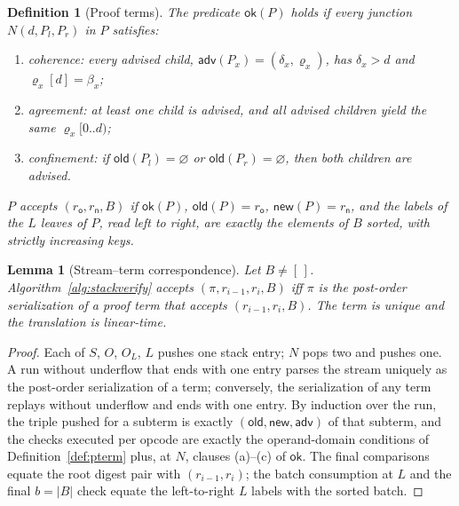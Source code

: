 \documentclass[11pt]{article}
\newtheorem{definition}{Definition}
\newtheorem{lemma}{Lemma}
\begin{document}
\begin{definition}[Proof terms]
The predicate $\mathsf{ok}(P)$ holds if every junction $N(d, P_l, P_r)$ in $P$ satisfies:
\begin{enumerate}[nosep,label=(\alph*)]
  \item \emph{coherence}: every advised child, $\mathsf{adv}(P_x) = (\delta_x, \varrho_x)$, has $\delta_x > d$ and $\varrho_x[d] = \beta_x$;
  \item \emph{agreement}: at least one child is advised, and all advised children yield the same $\varrho_x[0..d)$;
  \item \emph{confinement}: if $\mathsf{old}(P_l) = \varnothing$ or $\mathsf{old}(P_r) = \varnothing$, then both children are advised.
\end{enumerate}
$P$ \emph{accepts} $(r_{\mathsf o}, r_{\mathsf n}, B)$ if $\mathsf{ok}(P)$, $\mathsf{old}(P) = r_{\mathsf o}$, $\mathsf{new}(P) = r_{\mathsf n}$, and the labels of the $L$ leaves of $P$, read left to right, are exactly the elements of $B$ sorted, with strictly increasing keys.
\end{definition}

\begin{lemma}[Stream--term correspondence]
\label{lem:parse}
Let $B \neq [\,]$. Algorithm~\ref{alg:stackverify} accepts $(\pi, r_{i-1}, r_i, B)$ iff $\pi$ is the post-order serialization of a proof term that accepts $(r_{i-1}, r_i, B)$. The term is unique and the translation is linear-time.
\end{lemma}
\begin{proof}
Each of $S$, $O$, $O_L$, $L$ pushes one stack entry; $N$ pops two and pushes one. A run without underflow that ends with one entry parses the stream uniquely as the post-order serialization of a term; conversely, the serialization of any term replays without underflow and ends with one entry. By induction over the run, the triple pushed for a subterm is exactly $(\mathsf{old}, \mathsf{new}, \mathsf{adv})$ of that subterm, and the checks executed per opcode are exactly the operand-domain conditions of Definition~\ref{def:pterm} plus, at $N$, clauses (a)--(c) of $\mathsf{ok}$. The final comparisons equate the root digest pair with $(r_{i-1}, r_i)$; the batch consumption at $L$ and the final $b = |B|$ check equate the left-to-right $L$ labels with the sorted batch.
\end{proof}
\end{document}
